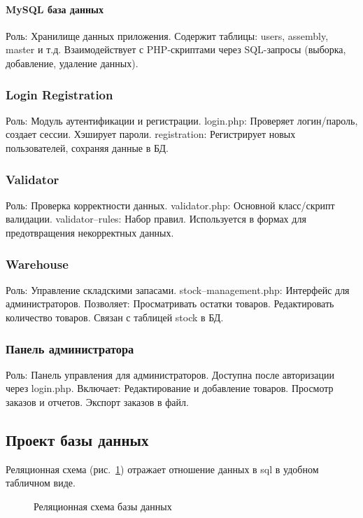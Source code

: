 \paragraph{MySQL база данных} 
Роль: Хранилище данных приложения.
Содержит таблицы: users, assembly, master и т.д.
Взаимодействует с PHP-скриптами через SQL-запросы (выборка, добавление, удаление данных).

\subsubsection{Login Registration}
Роль: Модуль аутентификации и регистрации.
login.php: Проверяет логин/пароль, создает сессии.
Хэширует пароли.
registration: Регистрирует новых пользователей, сохраняя данные в БД.

\subsubsection{Validator}
Роль: Проверка корректности данных.
validator.php: Основной класс/скрипт валидации.
validator--rules: Набор правил.
Используется в формах для предотвращения некорректных данных.

\subsubsection{Warehouse}
Роль: Управление складскими запасами.
stock--management.php: Интерфейс для администраторов. Позволяет:
Просматривать остатки товаров.
Редактировать количество товаров.
Связан с таблицей stock в БД.

\subsubsection{Панель администратора}
Роль: Панель управления для администраторов.
Доступна после авторизации через login.php.
Включает:
Редактирование и добавление товаров.
Просмотр заказов и отчетов.
Экспорт заказов в файл.

\newpage
\subsection{Проект базы данных}

Реляционная схема (рис.~\ref{struct:image}) отражает отношение данных в sql в удобном табличном виде.

\vspace{-8mm} 
\begin{figure}[ht]
\caption{Реляционная схема базы данных}
\label{struct:image}
\end{figure}

